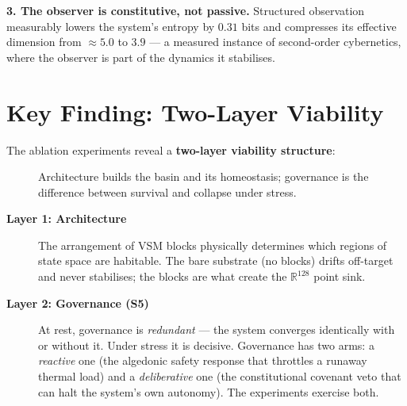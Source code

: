 \documentclass[11pt, a4paper]{article}
\newcommand{\R}{\mathbb{R}}
\begin{document}
\textbf{3. The observer is constitutive, not passive.} Structured observation
measurably lowers the system's entropy by $0.31$ bits and compresses its effective
dimension from $\approx 5.0$ to $3.9$ --- a measured instance of second-order
cybernetics, where the observer is part of the dynamics it stabilises.

\section*{Key Finding: Two-Layer Viability}

The ablation experiments reveal a \textbf{two-layer viability structure}:

\begin{figure}[h]
\centering
{}
\caption{Architecture builds the basin and its homeostasis; governance is the
difference between survival and collapse under stress.}
\label{fig:two_layer}
\end{figure}

\begin{description}
  \item[\textbf{Layer 1: Architecture}] The arrangement of VSM blocks physically
        determines which regions of state space are habitable. The bare substrate
        (no blocks) drifts off-target and never stabilises; the blocks are what
        create the $\R^{128}$ point sink.
  \item[\textbf{Layer 2: Governance (S5)}] At rest, governance is \emph{redundant}
        --- the system converges identically with or without it. Under stress it is
        decisive. Governance has two arms: a \emph{reactive} one (the algedonic
        safety response that throttles a runaway thermal load) and a
        \emph{deliberative} one (the constitutional covenant veto that can halt the
        system's own autonomy). The experiments exercise both.
\end{description}
\end{document}
